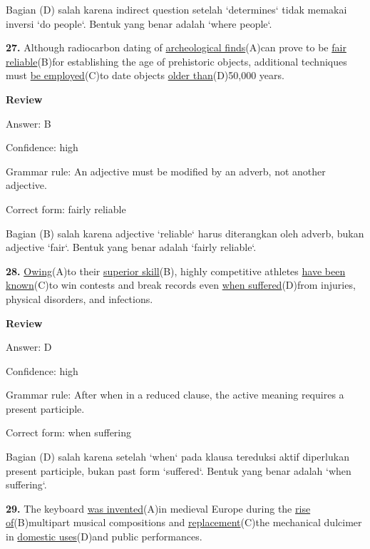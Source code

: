 \documentclass[12pt]{article}
\begin{document}
Bagian (D) salah karena indirect question setelah `determines` tidak memakai inversi `do people`. Bentuk yang benar adalah `where people`.\par
\endgroup
\par
\vspace{\questionblockgap}
\noindent\textbf{27.} Although radiocarbon dating of \uline{archeological finds}(A)can prove to be \uline{fair reliable}(B)for establishing the age of prehistoric objects, additional techniques must \uline{be employed}(C)to date objects \uline{older than}(D)50,000 years.
\par
\begingroup
\setlength{\parskip}{0pt}
\setlength{\parindent}{0pt}
\textbf{Review}\par
Answer: B\par
Confidence: high\par
Grammar rule: An adjective must be modified by an adverb, not another adjective.\par
Correct form: fairly reliable\par
Bagian (B) salah karena adjective `reliable` harus diterangkan oleh adverb, bukan adjective `fair`. Bentuk yang benar adalah `fairly reliable`.\par
\endgroup
\par
\vspace{\questionblockgap}
\noindent\textbf{28.} \uline{Owing}(A)to their \uline{superior skill}(B), highly competitive athletes \uline{have been known}(C)to win contests and break records even \uline{when suffered}(D)from injuries, physical disorders, and infections.
\par
\begingroup
\setlength{\parskip}{0pt}
\setlength{\parindent}{0pt}
\textbf{Review}\par
Answer: D\par
Confidence: high\par
Grammar rule: After when in a reduced clause, the active meaning requires a present participle.\par
Correct form: when suffering\par
Bagian (D) salah karena setelah `when` pada klausa tereduksi aktif diperlukan present participle, bukan past form `suffered`. Bentuk yang benar adalah `when suffering`.\par
\endgroup
\par
\vspace{\questionblockgap}
\noindent\textbf{29.} The keyboard \uline{was invented}(A)in medieval Europe during the \uline{rise of}(B)multipart musical compositions and \uline{replacement}(C)the mechanical dulcimer in \uline{domestic uses}(D)and public performances.
\end{document}
